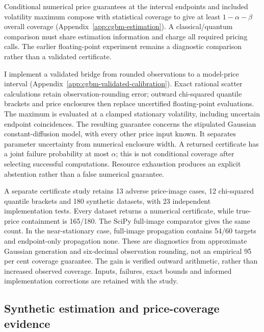 \documentclass[11pt]{article}
\begin{document}
Conditional numerical price guarantees at the interval endpoints and included
volatility maximum compose with statistical coverage to give at least
$1-\alpha-\beta$ overall coverage (Appendix~\ref{app:cgbm-estimation}).
A classical/quantum comparison must share estimation information and charge
all required pricing calls. The earlier floating-point experiment remains
a diagnostic comparison rather than a validated certificate.

I implement a validated bridge from rounded observations to a model-price
interval (Appendix~\ref{app:cgbm-validated-calibration}). Exact rational
scatter calculations retain observation-rounding error; outward
chi-squared quantile brackets and price enclosures then replace
uncertified floating-point evaluations. The maximum is evaluated at a
clamped stationary volatility, including uncertain endpoint coincidences.
The resulting guarantee concerns the stipulated Gaussian constant-diffusion
model, with every other price input known. It separates parameter
uncertainty from numerical enclosure width. A returned certificate has a
joint failure probability at most $\alpha$; this is not conditional
coverage after selecting successful computations. Resource exhaustion
produces an explicit abstention rather than a false numerical guarantee.

A separate certificate study retains 13 adverse price-image cases,
12 chi-squared quantile brackets and 180 synthetic datasets, with 23
independent implementation tests. Every dataset returns a numerical
certificate, while true-price containment is 165/180. The SciPy full-image
comparator gives the same count. In the near-stationary case, full-image
propagation contains 54/60 targets and endpoint-only propagation none.
These are diagnostics from approximate Gaussian generation and six-decimal
observation rounding, not an empirical 95 per cent coverage guarantee.
The gain is verified outward arithmetic, rather than increased observed
coverage. Inputs, failures, exact bounds and informed implementation
corrections are retained with the study.


\subsection{Synthetic estimation and price-coverage evidence}
\end{document}
